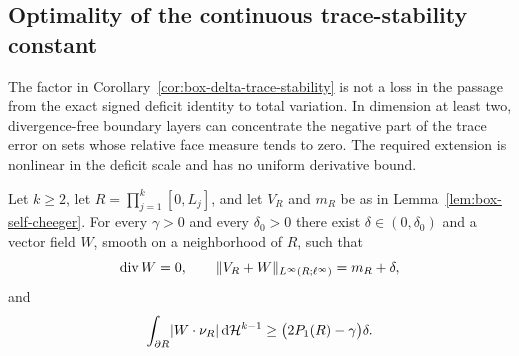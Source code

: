 \subsection{Optimality of the continuous trace-stability constant}

The factor in Corollary~\ref{cor:box-delta-trace-stability} is not a loss in
the passage from the exact signed deficit identity to total variation.  In
dimension at least two, divergence-free boundary layers can concentrate the
negative part of the trace error on sets whose relative face measure tends to
zero.  The required extension is nonlinear in the deficit scale and has no
uniform derivative bound.

\begin{theorem}
\label{thm:microstructured-trace-extension}
Let $k\ge2$, let $R=\prod_{j=1}^k[0,L_j]$, and let $V_R$ and $m_R$ be as in
Lemma~\ref{lem:box-self-cheeger}.  For every $\gamma>0$ and every
$\delta_0>0$ there exist $\delta\in(0,\delta_0)$ and a vector field $W$,
smooth on a neighborhood of $R$, such that
\[
 \operatorname{div} W=0,
 \qquad
 \lVert V_R+W \rVert_{L^\infty(R;\ell^\infty)}=m_R+\delta,
\]
and
\begin{equation}
\label{eq:microstructured-trace-lower-bound}
 \int_{\partial R}\lvert W\cdot\nu_R \rvert\,\mathrm{d}\mathcal{H}^{k-1}
 \ge \bigl(2P_1(R)-\gamma\bigr)\delta .
\end{equation}
\end{theorem}

